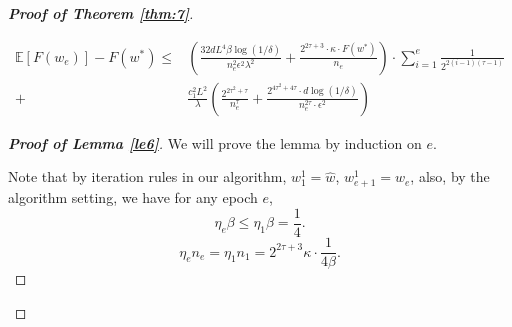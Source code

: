 \documentclass[12pt]{alt2022} %
\begin{document}
\begin{proof}[{\bf Proof of Theorem \ref{thm:7}}]
\begin{lemma}
	\begin{equation*}
	\begin{aligned}
	\mathbb{E}[F(w_e)]-F(w^*)\leq &\left(\frac{32 dL^4\beta\log(1/\delta)}{n_e^2\epsilon^2\lambda^2}+\frac{2^{2\tau+3}\cdot \kappa \cdot F(w^{*})}{n_e}\right) \cdot \sum\limits_{i=1}^{e}\frac{1}{2^{2(i-1)(\tau -1)}}\\
	+&\frac{c_1^2 L^2}{\lambda}\left(\frac{2^{2\tau^2+\tau}}{n_e^{\tau}}+\frac{2^{4\tau^2+4\tau  }\cdot d\log(1/\delta)}{n_e^{2\tau}\cdot \epsilon^2}\right)
	\end{aligned}
	\end{equation*}
\end{lemma}
\begin{proof}[{\bf Proof of Lemma \ref{le6}}]
	We will prove the lemma by induction on $e$. 
	
	Note that by iteration rules in our algorithm, $w_1^1=\hat{w}$, $ w_{e+1}^1=w_e$, also, by the algorithm setting, we have for any epoch $e$, 
	\begin{equation}\label{eq13}
	\eta_e\beta\leq \eta_1\beta= \frac{1}{4}.
	\end{equation} 
	\begin{equation}\label{eq14}
	\eta_{e}n_e=\eta_1n_1=2^{2\tau+3}\kappa\cdot \frac{1}{4\beta}.
	\end{equation} 
	

\end{proof}
\end{proof}
\end{document}
